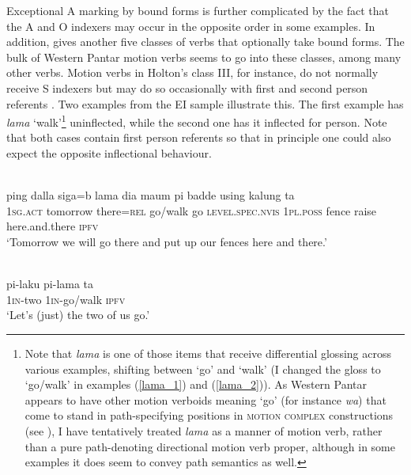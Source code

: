Exceptional A marking by bound forms is further complicated by the fact that the A and O indexers may occur in the opposite order in some examples. In addition, \citet{holton2010person} gives another five classes of verbs that optionally take bound forms. The bulk of Western Pantar motion verbs seems to go into these classes, among many other verbs. Motion verbs in Holton's class III, for instance, do not normally receive S indexers but may do so occasionally with first and second person referents \citep[109]{holton2010person}. Two examples from the EI sample illustrate this. The first example has \textit{lama} `walk'\footnote{Note that \textit{lama} is one of those items that receive differential glossing across various examples, shifting between `go' and `walk' (I changed the gloss to `go/walk' in examples (\ref{lama_1}) and (\ref{lama_2})). As Western Pantar appears to have other motion verboids meaning `go' (for instance \textit{wa}) that come to stand in path-specifying positions in \textsc{motion complex} constructions (see ), I have tentatively treated \textit{lama} as a manner of motion verb, rather than a pure path-denoting directional motion verb proper, although in some examples it does seem to convey path semantics as well.} uninflected, while the second one has it inflected for person. Note that both cases contain first person referents so that in principle one could also expect the opposite inflectional behaviour.

\ea \label{lama_1}
\\
\gll ping dalla siga=b lama dia maum pi badde using kalung ta \\
1\textsc{sg}.\textsc{act} tomorrow there=\textsc{rel} go/walk go \textsc{level.spec.nvis} 1\textsc{pl}.\textsc{poss} fence raise here.and.there \textsc{ipfv} \\
\glft `Tomorrow we will go there and put up our fences here and there.'\\ 
\z

\ea \label{lama_2}
\\
\gll pi-laku pi-lama ta \\
1\textsc{in}-two 1\textsc{in}-go/walk \textsc{ipfv} \\
\glft `Let's (just) the two of us go.'\\ 
\z


